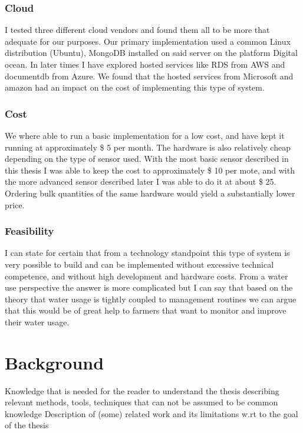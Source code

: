 \documentclass[]{uiophd}
\begin{document}
\subsection{Cloud}
I tested three different cloud vendors and found them all to be more that adequate for our purposes. Our primary implementation used a common Linux distribution (Ubuntu), MongoDB installed on said server on the platform Digital ocean. In later times I have explored hosted services like RDS from AWS and documentdb from Azure. We found that the hosted services from Microsoft and amazon had an impact on the cost of implementing this type of system.

\subsection{Cost}
We where able to run a basic implementation for a low cost, and have kept it running at approximately \$ 5 per month. The hardware is also relatively cheap depending on the type of sensor used. With the most basic sensor described in this thesis I was able to keep the cost to approximately \$ 10 per mote, and with the more advanced sensor described later I was able to do it at about \$ 25. Ordering bulk quantities of the same hardware would yield a substantially lower price.

\subsection{Feasibility}
I can state for certain that from a technology standpoint this type of system is very possible to build and can be implemented without excessive technical competence, and without high development and hardware costs. From a water use perspective the answer is more complicated but I can say that based on the theory that water usage is tightly coupled to management routines we can argue that this would be of great help to farmers that want to monitor and improve their water usage.


\chapter{Background}

Knowledge that is needed for the reader to understand the thesis describing relevant methods, tools, techniques that can not be assumed to be common knowledge
Description of (some) related work and its limitations w.rt to the goal of the thesis
\end{document}

